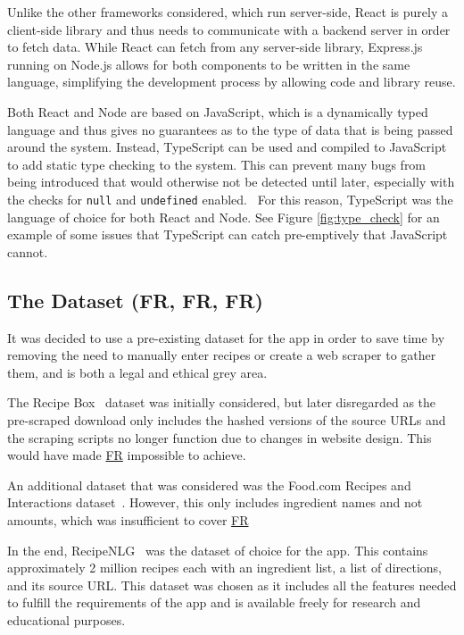 Unlike the other frameworks considered, which run server-side, React is purely a client-side library and thus
needs to communicate with a backend server in order to fetch data. While React can fetch from any server-side
library, Express.js running on Node.js allows for both components to be written in the same language, simplifying
the development process by allowing code and library reuse.

Both React and Node are based on JavaScript, which is a dynamically typed language and thus gives no guarantees
as to the type of data that is being passed around the system. Instead, TypeScript can be used and compiled to
JavaScript to add static type checking to the system. This can prevent many bugs from being introduced that would
otherwise not be detected until later, especially with the checks for \texttt{null} and \texttt{undefined} enabled.~\cite{gao_type_2017}
For this reason, TypeScript was the language of choice for both React and Node. See Figure \ref{fig:type_check} for an
example of some issues that TypeScript can catch pre-emptively that JavaScript cannot.

\subsection{The Dataset (FR, FR, FR)}\label{sec:data_pre_process}

It was decided to use a pre-existing dataset for the app in order to save time by removing the need to manually enter recipes
or create a web scraper to gather them, and is both a legal and ethical grey area.~\cite{murray_state_university_legality_2020}

The Recipe Box~\cite{lee_recipe_2017} dataset was initially considered, but later disregarded as the pre-scraped download only includes the
hashed versions of the source URLs and the scraping scripts no longer function due to changes in website design. This would have made
\hyperref[req:sources]{FR} impossible to achieve.

An additional dataset that was considered was the Food.com Recipes and Interactions dataset~\cite{li_foodcom_2019}. However, this only includes
ingredient names and not amounts, which was insufficient to cover \hyperref[req:track_amounts]{FR}

In the end, RecipeNLG~\cite{bien_recipenlg_2020} was the dataset of choice for the \chef{} app. This contains approximately 2 million recipes
each with an ingredient list, a list of directions, and its source URL. This dataset was chosen as it includes all the features needed to
fulfill the requirements of the app and is available freely for research and educational purposes.

